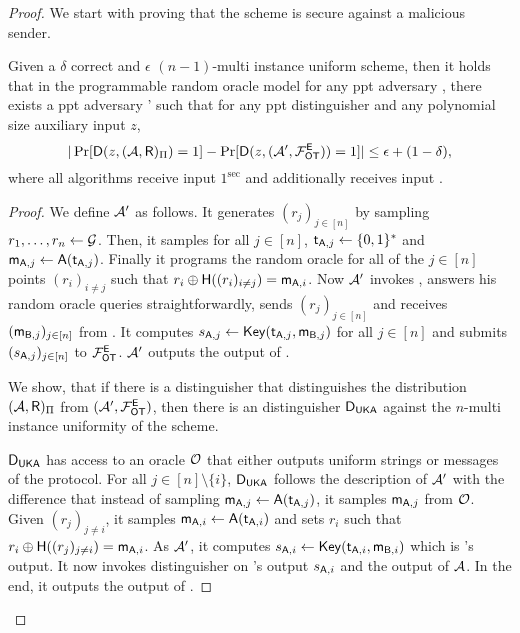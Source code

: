 \begin{proof}
We start with proving that the scheme is secure against a malicious sender. 
\begin{claim}\label{claim:malsender}
Given a $\delta$ correct and $\epsilon$ $(n-1)$-multi instance uniform \UKA scheme, then it holds that in the programmable random oracle model for any ppt adversary \Adv, there exists a ppt adversary \Adv' such that for any ppt distinguisher \D and any polynomial size auxiliary input $z$,
$$
|\Pr[\mathsf D(z,(\mathcal{A},\mathsf{R})_{\Pi})=1] -\Pr[\mathsf D(z, (\mathcal{A}', \mathcal{F}_{\mathsf{OT}}^\mathsf{E}))=1]|\leq \epsilon+(1-\delta),
$$
where all algorithms receive input $1^\sec$ and \rec additionally receives input \set.
\end{claim}

\begin{proof}
We define $\mathcal{A}'$ as follows. 
It generates $(r_j)_{j\in[n]}$ by sampling $r_1,\dots, r_n\leftarrow \mathcal{G}$. Then, it samples for all $j\in[n]$, $\mathsf{t}_{\mathsf{A},j}\leftarrow\{0,1\}^*$ and $\mathsf{m}_{\mathsf{A},j}\leftarrow\mathsf{A}(\mathsf{t}_{\mathsf{A},j})$. Finally it programs the random oracle for all of the $j\in[n]$ points $(r_i)_{i\neq j}$ such that $r_i\oplus\mathsf{H}((r_i)_{i\neq j})=\mathsf{m}_{\mathsf{A},i}$. Now $\mathcal{A}'$ invokes \Adv, answers his random oracle queries straightforwardly, sends $(r_j)_{j\in[n]}$ and receives $(\mathsf{m}_{\mathsf{B},j})_{j\in[n]}$ from \Adv. It computes $s_{\mathsf{A},j}\leftarrow\mathsf{Key}(\mathsf{t}_{\mathsf{A},j},\mathsf{m}_{\mathsf{B},j})$ for all $j\in[n]$ and submits $(s_{\mathsf{A},j})_{j\in [n]}$ to $\mathcal{F}_{\mathsf{OT}}^{\mathsf{E}}$. $\mathcal{A}'$ outputs the output of \Adv.

We show, that if there is a distinguisher \D that distinguishes the distribution $(\mathcal{A},\mathsf{R})_{\Pi}$ from $(\mathcal{A}',\mathcal{F}_{\mathsf{OT}}^{\mathsf{E}})$, then there is an distinguisher $\mathsf D_{\mathsf{UKA}}$ against the $n$-multi instance uniformity of the \UKA scheme. 

$\mathsf D_{\mathsf{UKA}}$ has access to an oracle $\mathcal{O}$ that either outputs uniform strings or messages of the \UKA protocol. For all $j\in[n]\setminus\{i\}$, $\mathsf D_{\mathsf{UKA}}$ follows the description of $\mathcal{A}'$ with the difference that instead of sampling  $\mathsf{m}_{\mathsf{A},j}\leftarrow\mathsf{A}(\mathsf{t}_{\mathsf{A},j})$, it samples $\mathsf{m}_{\mathsf{A},j}$ from $\mathcal{O}$. Given $(r_j)_{j\neq i}$, it samples $\mathsf{m}_{\mathsf{A},i}\leftarrow\mathsf{A}(\mathsf{t}_{\mathsf{A},i})$ and sets $r_i$ such that $r_i\oplus\mathsf{H}((r_j)_{j\neq i})=\mathsf{m}_{\mathsf{A},i}$. As $\mathcal{A}'$, it computes $s_{\mathsf{A},i}\leftarrow\mathsf{Key}(\mathsf{t}_{\mathsf{A},i},\mathsf{m}_{\mathsf{B},i})$ which is \rec's output. It now invokes distinguisher \D on \rec's output $s_{\mathsf{A},i}$ and the output of $\mathcal{A}$. In the end, it outputs the output of \D.



\end{proof}
\end{proof}
